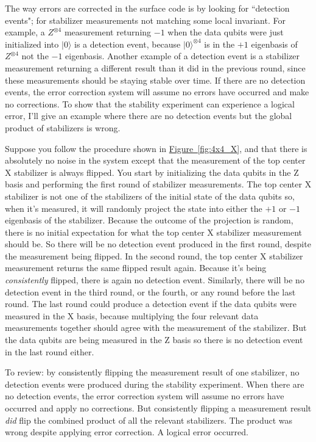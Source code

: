 \documentclass[onecolumn,unpublished,a4paper]{quantumarticle}
\theoremstyle{definition}
\theoremstyle{definition}
\theoremstyle{definition}
\newcommand{\fig}[1]{\hyperref[fig:#1]{Figure~\ref*{fig:#1}}}
\begin{document}
The way errors are corrected in the surface code is by looking for ``detection events"; for stabilizer measurements not matching some local invariant.
For example, a $Z^{\otimes 4}$ measurement returning $-1$ when the data qubits were just initialized into $|0\rangle$ is a detection event, because $|0\rangle^{\otimes 4}$ is in the $+1$ eigenbasis of $Z^{\otimes 4}$ not the $-1$ eigenbasis.
Another example of a detection event is a stabilizer measurement returning a different result than it did in the previous round, since these measurements should be staying stable over time.
If there are no detection events, the error correction system will assume no errors have occurred and make no corrections.
To show that the stability experiment can experience a logical error, I'll give an example where there are no detection events but the global product of stabilizers is wrong.

Suppose you follow the procedure shown in \fig{4x4_X}, and that there is absolutely no noise in the system except that the measurement of the top center X stabilizer is always flipped.
You start by initializing the data qubits in the Z basis and performing the first round of stabilizer measurements.
The top center X stabilizer is not one of the stabilizers of the initial state of the data qubits so, when it's measured, it will randomly project the state into either the $+1$ or $-1$ eigenbasis of the stabilizer.
Because the outcome of the projection is random, there is no initial expectation for what the top center X stabilizer measurement should be.
So there will be no detection event produced in the first round, despite the measurement being flipped.
In the second round, the top center X stabilizer measurement returns the same flipped result again.
Because it's being \emph{consistently} flipped, there is again no detection event.
Similarly, there will be no detection event in the third round, or the fourth, or any round before the last round.
The last round could produce a detection event if the data qubits were measured in the X basis, because multiplying the four relevant data measurements together should agree with the measurement of the stabilizer.
But the data qubits are being measured in the Z basis so there is no detection event in the last round either.

To review: by consistently flipping the measurement result of one stabilizer, no detection events were produced during the stability experiment.
When there are no detection events, the error correction system will assume no errors have occurred and apply no corrections.
But consistently flipping a measurement result \emph{did} flip the combined product of all the relevant stabilizers.
The product was wrong despite applying error correction.
A logical error occurred.
\end{document}
